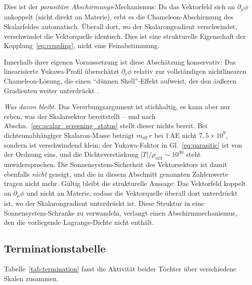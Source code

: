 \documentclass[aps,prd,twocolumn,superscriptaddress,nofootinbib]{revtex4-2}
\begin{document}
Dies ist der \textit{parasit\"are Abschirmungs}-Mechanismus: Da das Vektorfeld sich an $\partial_\mu\phi$ ankoppelt (nicht direkt an Materie), erbt es die Chameleon-Abschirmung des Skalarfeldes automatisch. \"Uberall dort, wo der Skalarongradient verschwindet, verschwindet die Vektorquelle identisch. Dies ist eine strukturelle Eigenschaft der Kopplung~\eqref{eq:coupling}, nicht eine Feinabstimmung.

Innerhalb ihrer eigenen Voraussetzung ist diese Absch\"atzung konservativ: Das linearisierte Yukawa-Profil \"ubersch\"atzt $\partial_r\phi$ relativ zur vollst\"andigen nichtlinearen Chameleon-L\"osung, die einen ``d\"unnen Shell''-Effekt aufweist, der den \"au\ss{}eren Gradienten weiter unterdr\"uckt \cite{HuSawicki2007}.

\textit{Was davon bleibt.} Das Vererbungsargument ist stichhaltig, es kann aber nur erben, was der Skalarsektor bereitstellt -- und nach Abschn.~\ref{sec:scalar_screening_status} stellt dieser nichts bereit. Bei dichteunabh\"angiger Skalaron-Masse betr\"agt $m_{\mathrm{eff}}\,r$ bei $1$\,AE nicht $7{,}5 \times 10^{9}$, sondern ist verschwindend klein; der Yukawa-Faktor in Gl.~\eqref{eq:parasitic} ist von der Ordnung eins, und die Dichteverst\"arkung $|T|/\rho_{\mathrm{crit}} \sim 10^{30}$ steht unwidersprochen. Die Sonnensystem-Sicherheit des Vektorsektors ist damit ebenfalls \textit{nicht} gezeigt, und die in diesem Abschnitt genannten Zahlenwerte tragen nicht mehr. G\"ultig bleibt die strukturelle Aussage: Das Vektorfeld koppelt an $\partial_\mu\phi$ und nicht an Materie, sodass die Vektorquelle \"uberall dort unterdr\"uckt ist, wo der Skalarongradient unterdr\"uckt ist. Diese Struktur in eine Sonnensystem-Schranke zu verwandeln, verlangt einen Abschirmmechanismus, den die vorliegende Lagrange-Dichte nicht enth\"alt.

\subsection{Terminationstabelle}

Tabelle~\ref{tab:termination} fasst die Aktivit\"at beider T\"ochter \"uber verschiedene Skalen zusammen.
\end{document}
